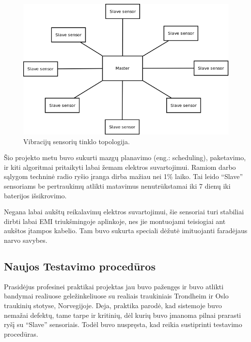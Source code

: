 \documentclass[12pt, a4paper, lithuanian, final]{article}
\begin{document}
\begin{figure}[H]
\begin{center}
\includegraphics[width=1\textwidth]{img/NorgeRail_star.png}
\caption{Vibracijų sensorių tinklo topologija.}
\end{center}
\end{figure}

Šio projekto metu buvo sukurti mazgų planavimo (eng.: scheduling), paketavimo, ir kiti algoritmai pritaikyti labai žemam elektros suvartojimui.
Ramiom darbo sąlygom techninė radio ryšio įranga dirba mažiau nei 1\% laiko.
Tai leido "`Slave"' sensoriams be pertraukimų atlikti matavimus nenutrūkstamai iki 7 dienų iki baterijos išsikrovimo.

Negana labai aukštų reikalavimų elektros suvartojimui, šie sensoriai turi stabiliai dirbti labai EMI triukšmingoje aplinkoje, nes jie montuojami teisiogiai ant aukštos įtampos kabelio.
Tam buvo sukurta speciali dėžutė imituojanti faradėjaus narvo savybes.


\subsection{Naujos Testavimo procedūros}

Prasidėjus profesinei praktikai projektas jau buvo pažengęs ir buvo atlikti bandymai realiuose geležinkeliuose su realiais traukiniais Trondheim ir Oslo traukinių stotyse, Norvegijoje.
Deja, praktika parodė, kad sistemoje buvo nemažai defektų, tame tarpe ir kritinių, dėl kurių buvo įmanoma pilnai prarasti ryšį su "`Slave"' sensoriais.
Todėl buvo nuspręsta, kad reikia sustiprinti testavimo procedūras.
\end{document}
